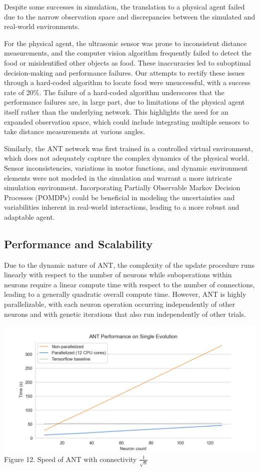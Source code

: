 \documentclass{article}
\begin{document}
\begin{multicols}{2}
	Despite some successes in simulation, the translation to a physical agent failed due to the narrow observation space and discrepancies between the simulated and real-world environments.
 
For the physical agent, the ultrasonic sensor was prone to inconsistent distance measurements, and the computer vision algorithm frequently failed to detect the food or misidentified other objects as food. These inaccuracies led to suboptimal decision-making and performance failures. Our attempts to rectify these issues through a hard-coded algorithm to locate food were unsuccessful, with a success rate of 20\%. The failure of a hard-coded algorithm underscores that the performance failures are, in large part, due to limitations of the physical agent itself rather than the underlying network. This highlights the need for an expanded observation space, which could include integrating multiple sensors to take distance measurements at various angles.

Similarly, the ANT network was first trained in a controlled virtual environment, which does not adequately capture the complex dynamics of the physical world. Sensor inconsistencies, variations in motor functions, and dynamic environment elements were not modeled in the simulation and warrant a more intricate simulation environment. Incorporating Partially Observable Markov Decision Processes (POMDPs) could be beneficial in modeling the uncertainties and variabilities inherent in real-world interactions, leading to a more robust and adaptable agent.
	
	\subsection{Performance and Scalability}
	
	Due to the dynamic nature of ANT, the complexity of the update procedure runs linearly with respect to the number of neurons while suboperations within neurons require a linear compute time with respect to the number of connections, leading to a generally quadratic overall compute time. However, ANT is highly parallelizable, with each neuron operation occurring independently of other neurons and with genetic iterations that also run independently of other trials. 
	
	\begin{center}
		\includegraphics[scale=0.47]{figs/ant_performance_2.png}
		\small Figure 12. Speed of ANT with connectivity $\frac{1}{\sqrt{n}}$
	\end{center}


\end{multicols}
\end{document}
